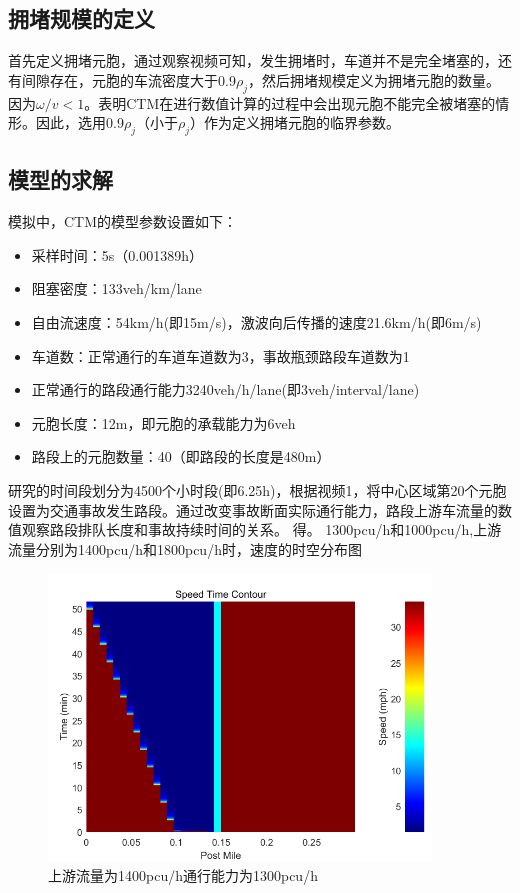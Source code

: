 \documentclass[UTF8,12.05pt]{ctexart}
\begin{document}
\subsection{拥堵规模的定义}首先定义拥堵元胞，通过观察视频可知，发生拥堵时，车道并不是完全堵塞的，还有间隙存在，元胞的车流密度大于0.9$\rho_{j}$，然后拥堵规模定义为拥堵元胞的数量。因为$\omega/v<1$。表明CTM在进行数值计算的过程中会出现元胞不能完全被堵塞的情形。因此，选用0.9$\rho_{j}$（小于$\rho_{j}$）作为定义拥堵元胞的临界参数。
\subsection{模型的求解}
模拟中，CTM的模型参数设置如下：
\begin{itemize}
  \item 采样时间：5s（0.001389h）
  \item 阻塞密度：133veh/km/lane
  \item 自由流速度：54km/h(即15m/s)，激波向后传播的速度21.6km/h(即6m/s)
  \item 车道数：正常通行的车道车道数为3，事故瓶颈路段车道数为1
  \item 正常通行的路段通行能力3240veh/h/lane(即3veh/interval/lane)
  \item 元胞长度：12m，即元胞的承载能力为6veh
  \item 路段上的元胞数量：40（即路段的长度是480m）
\end{itemize}
研究的时间段划分为4500个小时段(即6.25h)，根据视频1，将中心区域第20个元胞设置为交通事故发生路段。通过改变事故断面实际通行能力，路段上游车流量的数值观察路段排队长度和事故持续时间的关系。
得。
1300pcu/h和1000pcu/h,上游流量分别为1400pcu/h和1800pcu/h时，速度的时空分布图
\begin{figure}[H]
  \centering
  \includegraphics[width=4.00in]{13001400.png}
  \caption{上游流量为1400pcu/h通行能力为1300pcu/h}
\end{figure}
\end{document}

